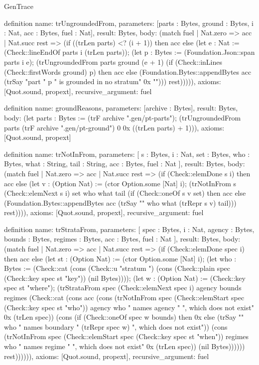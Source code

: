 \begin{lexlean}{GenTrace}
\begin{semanticmodule}
definition{
  name: trUngroundedFrom,
  parameters: [parts : Bytes, ground : Bytes, i : Nat, acc : Bytes, fuel : Nat],
  result: Bytes,
  body: (match fuel
    | Nat.zero => acc
    | Nat.succ rest => (if ((trLen parts) <? (i + 1)) then acc else (let e : Nat := (Check::lineEndOf parts i (trLen parts)); (let p : Bytes := (Foundation.Json::span parts i e); (trUngroundedFrom parts ground (e + 1) (if (Check::inLines (Check::firstWords ground) p) then acc else (Foundation.Bytes::appendBytes acc (trSay "part " p " is grounded in no stratum" 0x ""))) rest))))),
  axioms: [Quot.sound, propext],
  recursive_argument: fuel
}

definition{
  name: groundReasons,
  parameters: [archive : Bytes],
  result: Bytes,
  body: (let parts : Bytes := (trF archive ".gen/pt-parts"); (trUngroundedFrom parts (trF archive ".gen/pt-ground") 0 0x ((trLen parts) + 1))),
  axioms: [Quot.sound, propext]
}

definition{
  name: trNotInFrom,
  parameters: [
    s : Bytes,
    i : Nat,
    set : Bytes,
    who : Bytes,
    what : String,
    tail : String,
    acc : Bytes,
    fuel : Nat
  ],
  result: Bytes,
  body: (match fuel
    | Nat.zero => acc
    | Nat.succ rest => (if (Check::elemDone s i) then acc else (let v : (Option Nat) := (ctor Option.some [Nat] i); (trNotInFrom s (Check::elemNext s i) set who what tail (if (Check::oneOf s v set) then acc else (Foundation.Bytes::appendBytes acc (trSay "" who what (trRepr s v) tail))) rest)))),
  axioms: [Quot.sound, propext],
  recursive_argument: fuel
}

definition{
  name: trStrataFrom,
  parameters: [
    spec : Bytes,
    i : Nat,
    agency : Bytes,
    bounds : Bytes,
    regimes : Bytes,
    acc : Bytes,
    fuel : Nat
  ],
  result: Bytes,
  body: (match fuel
    | Nat.zero => acc
    | Nat.succ rest => (if (Check::elemDone spec i) then acc else (let st : (Option Nat) := (ctor Option.some [Nat] i); (let who : Bytes := (Check::cat (cons (Check::u "stratum ") (cons (Check::plain spec (Check::key spec st "key")) (nil Bytes)))); (let w : (Option Nat) := (Check::key spec st "where"); (trStrataFrom spec (Check::elemNext spec i) agency bounds regimes (Check::cat (cons acc (cons (trNotInFrom spec (Check::elemStart spec (Check::key spec st "who")) agency who " names agency " ", which does not exist" 0x (trLen spec)) (cons (if (Check::oneOf spec w bounds) then 0x else (trSay "" who " names boundary " (trRepr spec w) ", which does not exist")) (cons (trNotInFrom spec (Check::elemStart spec (Check::key spec st "when")) regimes who " names regime " ", which does not exist" 0x (trLen spec)) (nil Bytes)))))) rest)))))),
  axioms: [Quot.sound, propext],
  recursive_argument: fuel
}


\end{semanticmodule}
\end{lexlean}
